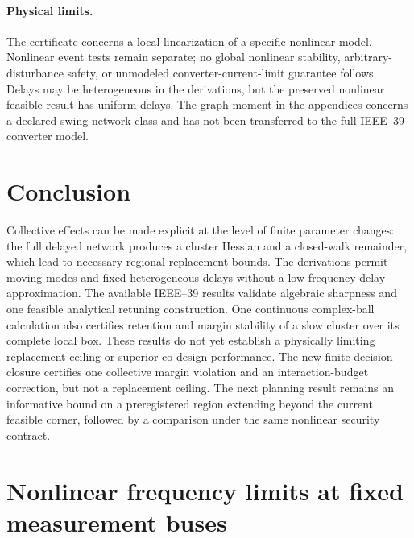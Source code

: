 \documentclass[11pt]{article}
\begin{document}
\paragraph{Physical limits.}
The certificate concerns a local linearization of a specific
nonlinear model. Nonlinear event tests remain separate; no global
nonlinear stability, arbitrary-disturbance safety, or unmodeled
converter-current-limit guarantee follows. Delays may be
heterogeneous in the derivations, but the preserved nonlinear
feasible result has uniform delays. The graph moment in the
appendices concerns a declared swing-network class and has not
been transferred to the full IEEE--39 converter model.

\section{Conclusion}
Collective effects can be made explicit at the level of finite
parameter changes: the full delayed network produces a cluster
Hessian and a closed-walk remainder, which lead to necessary
regional replacement bounds. The derivations permit moving modes
and fixed heterogeneous delays without a low-frequency delay
approximation. The available IEEE--39 results validate algebraic
sharpness and one feasible analytical retuning construction.
One continuous complex-ball calculation also certifies retention and
margin stability of a slow cluster over its complete local box.
These results do not yet establish a physically limiting replacement ceiling
or superior co-design performance. The new finite-decision closure certifies one collective margin violation and an interaction-budget correction, but not a replacement ceiling. The next planning result remains an informative bound on a preregistered region extending beyond the
current feasible corner, followed by a comparison under the same
nonlinear security contract.

\section{Nonlinear frequency limits at fixed measurement buses}
\label{sec:nonlinear-fixed-bus}
\end{document}
